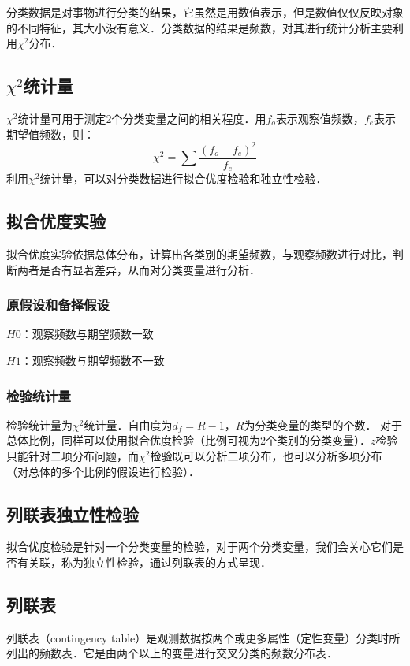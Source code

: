分类数据是对事物进行分类的结果，它虽然是用数值表示，但是数值仅仅反映对象的不同特征，其大小没有意义．分类数据的结果是频数，对其进行统计分析主要利用$\chi^2$分布．
\subsection{$\chi^2$统计量}
$\chi^2$统计量可用于测定2个分类变量之间的相关程度．用$f_o$表示观察值频数，$f_e$表示期望值频数，则：
\begin{equation}
\chi^2 =  \sum \frac {(f_o-f_e)^2}{f_e}
\end{equation}
利用$\chi^2$统计量，可以对分类数据进行拟合优度检验和独立性检验．
\subsection{拟合优度实验}
拟合优度实验依据总体分布，计算出各类别的期望频数，与观察频数进行对比，判断两者是否有显著差异，从而对分类变量进行分析．
\subsubsection{原假设和备择假设}
$H0$：观察频数与期望频数一致

$H1$：观察频数与期望频数不一致
\subsubsection{检验统计量}
检验统计量为$\chi^2$统计量．自由度为$d_f = R-1$，$R$为分类变量的类型的个数．
对于总体比例，同样可以使用拟合优度检验（比例可视为2个类别的分类变量）．$z$检验只能针对二项分布问题，而$\chi^2$检验既可以分析二项分布，也可以分析多项分布（对总体的多个比例的假设进行检验）．
\begin{example}{}

\end{example}
\subsection{列联表独立性检验}
拟合优度检验是针对一个分类变量的检验，对于两个分类变量，我们会关心它们是否有关联，称为独立性检验，通过列联表的方式呈现．
\subsection{列联表}
列联表（contingency table）是观测数据按两个或更多属性（定性变量）分类时所列出的频数表．它是由两个以上的变量进行交叉分类的频数分布表．